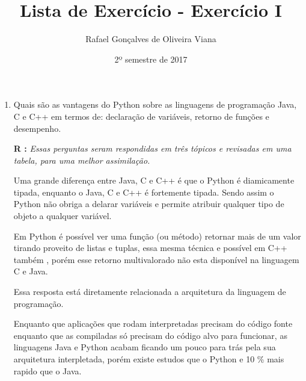 \documentclass[12pt]{article}
\title{Lista de Exercício  - Exercício I }
\author{Rafael Gonçalves de  Oliveira Viana}
\date{2º semestre de 2017}
\begin{document}
\maketitle

\begin{enumerate}
\item
Quais são as vantagens do Python sobre as linguagens de programação Java, C e C++
em termos de: declaração de variáveis, retorno de funções e desempenho.


\textbf{R :}\textit{
	Essas perguntas seram respondidas em três tópicos e revisadas em uma tabela, para uma melhor assimilação.}
	
	
	 Uma grande diferença entre Java, C e C++ é que o Python é diamicamente tipada, enquanto o Java, C e C++ é fortemente tipada. Sendo assim o Python não obriga a delarar variáveis e permite atribuir qualquer tipo de objeto a qualquer variável.
	 
	 

	 
		 
	Em Python é possível ver uma função (ou método) retornar mais de um valor tirando proveito de listas e tuplas, essa mesma técnica e possível em C++ também , porém esse retorno multivalorado não esta disponível na linguagem C e Java.
	 
	 Essa resposta está diretamente relacionada a arquitetura da linguagem de programação.
	 
	 Enquanto que aplicações que rodam interpretadas precisam do código fonte enquanto que as compiladas só precisam do código alvo para funcionar, as linguagens Java e Python acabam ficando um pouco para trás pela sua arquitetura interpletada, porém existe estudos que o Python e 10 \% mais rapido que o Java. 
	 

\end{enumerate}
\end{document}
